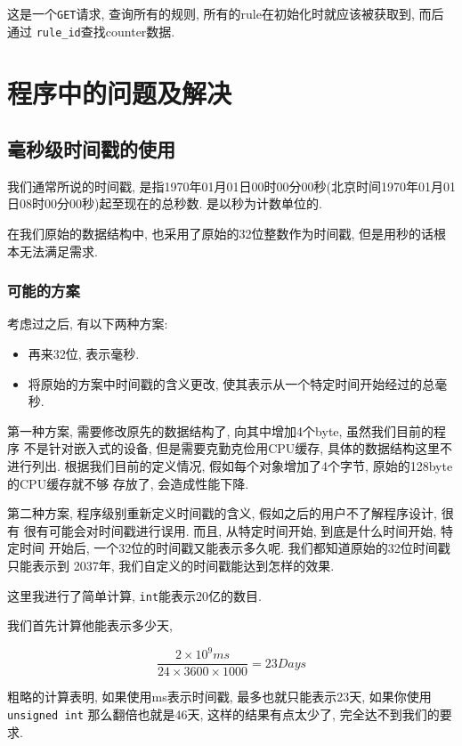 这是一个\texttt{GET}请求, 查询所有的规则, 所有的rule在初始化时就应该被获取到,
而后通过 \texttt{rule\_id}查找counter数据.


\chapter{程序中的问题及解决}\label{chap:程序中的问题及解决}

\section{毫秒级时间戳的使用}

我们通常所说的时间戳,
是指1970年01月01日00时00分00秒(北京时间1970年01月01日08时00分00秒)起至现在的总秒数.
是以秒为计数单位的.

在我们原始的数据结构中, 也采用了原始的32位整数作为时间戳,
但是用秒的话根本无法满足需求.

\subsection{可能的方案}

考虑过之后, 有以下两种方案:

\begin{itemize}
\item
  再来32位, 表示毫秒.
\item
  将原始的方案中时间戳的含义更改,
  使其表示从一个特定时间开始经过的总毫秒.
\end{itemize}

第一种方案, 需要修改原先的数据结构了, 向其中增加4个byte,
虽然我们目前的程序 不是针对嵌入式的设备, 但是需要克勤克俭用CPU缓存,
具体的数据结构这里不进行列出. 根据我们目前的定义情况,
假如每个对象增加了4个字节, 原始的128byte的CPU缓存就不够 存放了,
会造成性能下降.

第二种方案, 程序级别重新定义时间戳的含义, 假如之后的用户不了解程序设计,
很有 很有可能会对时间戳进行误用. 而且, 从特定时间开始,
到底是什么时间开始, 特定时间 开始后, 一个32位的时间戳又能表示多久呢.
我们都知道原始的32位时间戳只能表示到 2037年,
我们自定义的时间戳能达到怎样的效果.

这里我进行了简单计算, \texttt{int}能表示20亿的数目.

我们首先计算他能表示多少天,

$$ \frac{2 \times 10^{9} ms }{24 \times 3600 \times 1000} = 23 Days$$

粗略的计算表明, 如果使用ms表示时间戳, 最多也就只能表示23天,
如果你使用\texttt{unsigned\ int} 那么翻倍也就是46天,
这样的结果有点太少了, 完全达不到我们的要求.

